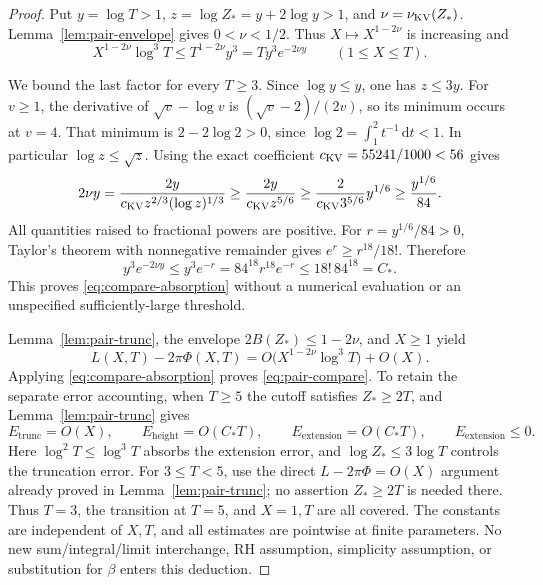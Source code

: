 \documentclass[11pt]{article}
\newcommand{\dd}{\,\mathrm d}
\newcommand{\ELtr}{E_{\mathrm{trunc}}}
\newcommand{\ELh}{E_{\mathrm{height}}}
\newcommand{\ELext}{E_{\mathrm{extension}}}
\begin{document}
\begin{proof}
Put \(y=\log T>1\), \(z=\log Z_*=y+2\log y>1\), and
\(\nu=\nu_{\rm KV}(Z_*)\). Lemma~\ref{lem:pair-envelope} gives
\(0<\nu<1/2\). Thus \(X\mapsto X^{1-2\nu}\) is increasing and
\begin{equation}\label{eq:compare-x-uniform}
 X^{1-2\nu}\log^3T
 \leq T^{1-2\nu}y^3=T y^3e^{-2\nu y}
 \qquad(1\leq X\leq T).
\end{equation}

We bound the last factor for every \(T\geq3\).
Since \(\log y\leq y\), one has \(z\leq3y\).
For \(v\geq1\), the derivative of \(\sqrt v-\log v\) is
\((\sqrt v-2)/(2v)\), so its minimum occurs at \(v=4\).
That minimum is \(2-2\log2>0\), since
\(\log2=\int_1^2t^{-1}\dd t<1\).
In particular \(\log z\leq\sqrt z\).
Using the exact coefficient \(c_{\rm KV}=55241/1000<56\) gives
\begin{equation}\label{eq:compare-decay}
 2\nu y
 =\frac{2y}{c_{\rm KV}z^{2/3}(\log z)^{1/3}}
 \geq\frac{2y}{c_{\rm KV}z^{5/6}}
 \geq\frac{2}{c_{\rm KV}3^{5/6}}y^{1/6}
 \geq\frac{y^{1/6}}{84}.
\end{equation}
All quantities raised to fractional powers are positive.
For \(r=y^{1/6}/84>0\), Taylor's theorem with nonnegative remainder
gives \(e^r\geq r^{18}/18!\). Therefore
\[
 y^3e^{-2\nu y}\leq y^3e^{-r}
 =84^{18}r^{18}e^{-r}\leq18!\,84^{18}=C_*.
\]
This proves \eqref{eq:compare-absorption} without a numerical evaluation
or an unspecified sufficiently-large threshold.

Lemma~\ref{lem:pair-trunc}, the envelope
\(2B(Z_*)\leq1-2\nu\), and \(X\geq1\) yield
\[
 L(X,T)-2\pi\Phi(X,T)
 =O\bigl(X^{1-2\nu}\log^3T\bigr)+O(X).
\]
Applying \eqref{eq:compare-absorption} proves
\eqref{eq:pair-compare}. To retain the separate error accounting,
when \(T\geq5\) the cutoff satisfies \(Z_*\geq2T\), and
Lemma~\ref{lem:pair-trunc} gives
\[
 \ELtr=O(X),\qquad
 \ELh=O(C_*T),\qquad
 \ELext=O(C_*T),\qquad \ELext\leq0.
\]
Here \(\log^2T\leq\log^3T\) absorbs the extension error, and
\(\log Z_*\leq3\log T\) controls the truncation error.
For \(3\leq T<5\), use the direct
\(L-2\pi\Phi=O(X)\) argument already proved in
Lemma~\ref{lem:pair-trunc}; no assertion \(Z_*\geq2T\) is needed there.
Thus \(T=3\), the transition at \(T=5\), and \(X=1,T\) are all covered.
The constants are independent of \(X,T\), and all estimates are
pointwise at finite parameters. No new sum/integral/limit interchange,
RH assumption, simplicity assumption, or substitution for \(\beta\)
enters this deduction.
\end{proof}
\end{document}
